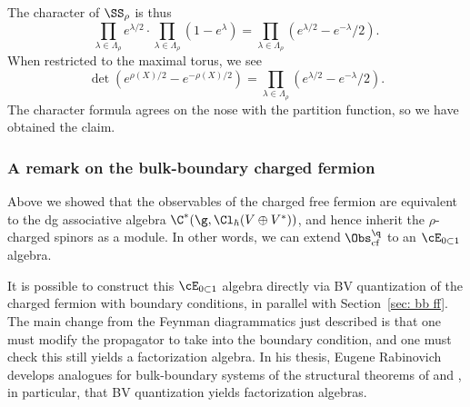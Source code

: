 \documentclass[10pt]{amsart}
\def\ogil{\textcolor{violet}}
\begin{document}
The character of $\SS_\rho$ is thus
\[
\prod_{\lambda \in \Lambda_\rho} e^{\lambda/2} \cdot \prod_{\lambda \in \Lambda_\rho} (1-e^{\lambda}) = \prod_{\lambda \in \Lambda_\rho} (e^{\lambda/2}-e^{-\lambda}/2). 
\]
When restricted to the maximal torus, we see
\[
\det(e^{\rho(X)/2} - e^{-\rho(X)/2}) = \prod_{\lambda \in \Lambda_\rho} (e^{\lambda/2}-e^{-\lambda}/2). 
\]
The character formula agrees on the nose with the partition function, so we have obtained the claim.

%

\subsubsection{A remark on the bulk-boundary charged fermion}

Above we showed that the observables of the charged free fermion are equivalent to the dg associative algebra $\C^*(\g, \Cl_\hbar(V \oplus V^*))$,
and hence inherit the $\rho$-charged spinors as a module.
In other words,
we can extend $\Obs^\q_{\rm cf}$ to an $\cE_{0 \subset 1}$ algebra.

It is possible to construct this $\cE_{0 \subset 1}$ algebra directly via BV quantization of the charged fermion with boundary conditions,
in parallel with Section~\ref{sec: bb ff}.
The main change from the Feynman diagrammatics just described is that one must modify the propagator to take into the boundary condition,
and one must check this still yields a factorization algebra.
In his thesis, Eugene Rabinovich \cite{RabThesis} develops analogues for bulk-boundary systems of the structural theorems of \cite{CosBook} and \cite{CG2},
in particular, that BV quantization yields factorization algebras.
\end{document}
